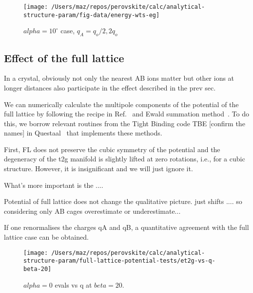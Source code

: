 \documentclass[a4paper,prb]{revtex4-1}  %
\begin{document}
\begin{figure}[htbp]
\begin{center}
\texttt{[image: /Users/maz/repos/perovskite/calc/analytical-structure-param/fig-data/energy-wts-eg]}
\caption{$alpha=10^\circ$ case, $q_A=q_o/2,2q_o$}
\label{fig:e-wts-eg}
\end{center}
\end{figure}







\subsection{Effect of the full lattice}

In a crystal, obviously not only the nearest AB ions matter but other ions at longer distances also participate in the effect described in the prev sec.

We can numerically calculate the multipole components of the potential of the full lattice by following the recipe in Ref.~\cite{PaxtonNotes, book?}
and Ewald summation method~\cite{Ewald}.
To do this, 
we borrow relevant routines from the Tight Binding code TBE [confirm the names] in Questaal~\cite{https://www.questaal.org/} that implements these methods.


First,
FL does not preserve the cubic symmetry of the potential and the degeneracy of the t2g manifold 
is slightly lifted at zero rotations, i.e., for a cubic structure.
However, it is insignificant and we will just ignore it.

What's more important is the .... 

Potential of full lattice does not change the qualitative picture.
just shifts  .... so considering only AB cages overestimate or underestimate... 

If one renormalises the charges qA and qB, a
quantitative agreement with the full lattice case can be obtained.








\begin{figure}[htbp]
\begin{center}
\texttt{[image: /Users/maz/repos/perovskite/calc/analytical-structure-param/full-lattice-potential-tests/et2g-vs-q-beta-20]}
\caption{$alpha=0$ evals vs q at $beta=20$. 
}
\label{fig:evals-q-beta}
\end{center}
\end{figure}
\end{document}
